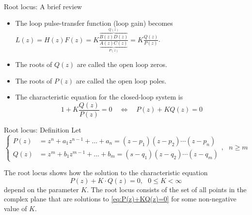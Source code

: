 \documentclass[presentation,aspectratio=169]{beamer}
\begin{document}
\begin{frame}[label=sec-3-1]{Root locus: A brief review}
\begin{center}
\end{center}

\begin{itemize}
\item The loop pulse-transfer function (loop gain) becomes \(L(z) = H(z)F(z) = K\frac{\overbrace{B(z)D(z)}^{Q(z)}}{\underbrace{A(z)C(z)}_{P(z)}} = K \frac{Q(z)}{P(z)}\).
\item The roots of \(Q(z)\) are called the \alert{open loop zeros}.
\item The roots of \(P(z)\) are called the \alert{open loop poles}.
\item The characteristic equation for the closed-loop system is \[ 1 + K\frac{Q(z)}{P(z)} = 0 \quad \Leftrightarrow \quad P(z) + KQ(z) = 0\]
\end{itemize}
\end{frame}


\begin{frame}[label=sec-3-2]{Root locus: Definition}
Let
\[\begin{cases} P(z)&=z^n+a_1z^{n-1}+\dots+a_n = (z-p_1)(z-p_2)\cdots(z-p_n)\\ 
Q(z)&=z^m+b_1 z^{m-1}+\dots+b_m=(s-q_1)(z-q_2)\cdots(z-q_m) \end{cases},\ \ \ n\ge m \]

The root locus shows how the \alert{solution} to the characteristic equation
\begin{equation}
\label{eq:P(z)+KQ(z)=0}
P(z)+K\cdot Q(z)=0,\ \ \ 0\le K<\infty
\end{equation}
depend on the parameter $K$. The root locus consists of the set of all points in the complex plane that are solutions to \eqref{eq:P(z)+KQ(z)=0} for some non-negative value of $K$.
\end{frame}
\end{document}
